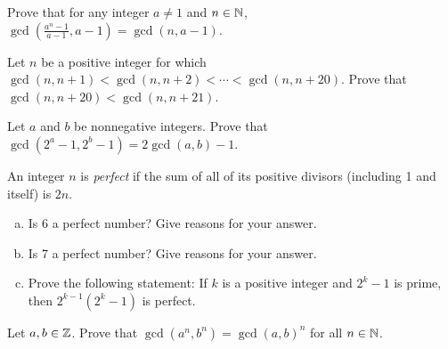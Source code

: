 
\question Prove that for any integer $a \neq 1$ and $n\in\mathbb{N}$,
$\gcd\left( \frac{a^n-1}{a-1}, a-1 \right) = \gcd(n, a-1)$.

\question Let $n$ be a positive integer for which
$\gcd(n, n + 1) < \gcd(n, n + 2) < \cdots < {\gcd(n, n + 20)}$.
Prove that $\gcd(n, n + 20) < \gcd(n, n + 21)$.

\question Let $a$ and $b$ be nonnegative integers.
Prove that $\gcd(2^a - 1, 2^b - 1) = 2\gcd(a,b) - 1$.

\question An integer $n$ is \emph{perfect} if the sum of all of its positive divisors
(including 1 and itself) is $2n$.
\begin{enumerate}[(a)]
  \item Is 6 a perfect number? Give reasons for your answer.
  \item Is 7 a perfect number? Give reasons for your answer.
  \item Prove the following statement:
        If $k$ is a positive integer and $2^k-1$ is prime, then $2^{k-1}(2^k-1)$ is perfect.
\end{enumerate}

\question Let $a,b\in\mathbb{Z}$. Prove that $\gcd(a^n, b^n) = \gcd(a, b)^n$ for all $n\in\mathbb{N}$.

